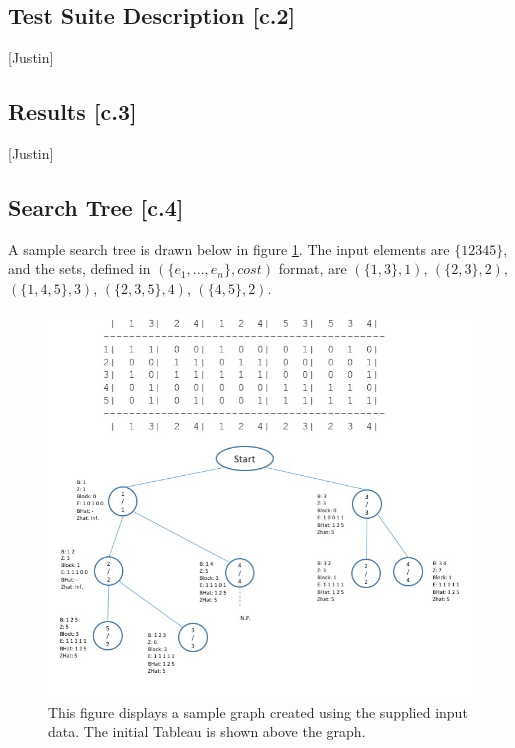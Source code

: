 \documentclass[12pt]{article}
\begin{document}
\subsection{Test Suite Description [c.2]}
[Justin]
\subsection{Results [c.3]}
[Justin]
\subsection{Search Tree [c.4]}

A sample search tree is drawn below in figure \ref{fig:samplegraph}. The input elements are $\{1 2 3 4 5\}$, and the sets, defined in $(\{e_1,...,e_n\}, cost)$ format, are $(\{1, 3\},1)$,
$(\{2, 3\},2)$,
$(\{1, 4, 5\},3)$,
$(\{2, 3, 5\},4)$,
$(\{4, 5\}, 2)$.

\begin{figure}[ht!] \label{fig:samplegraph}
	
	
	\centering
	\includegraphics[width = 5.5in]{graph1.png}
	
	
	\caption{This figure displays a sample graph created using the supplied input data. The initial Tableau is shown above the graph.}
	
	
\end{figure}
\end{document}
